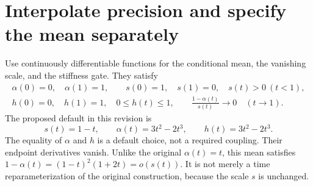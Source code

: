 \documentclass[11pt,letterpaper]{article}
\begin{document}
\section{Interpolate precision and specify the mean separately}\label{sec:path}

Use continuously differentiable functions for the conditional mean, the vanishing scale, and the stiffness gate. They satisfy
\begin{equation}\label{eq:scheduleconditions}
\begin{gathered}
\alpha(0)=0,\quad \alpha(1)=1,\qquad
s(0)=1,\quad s(1)=0,\quad s(t)>0\ (t<1),\\
h(0)=0,\quad h(1)=1,\quad 0\le h(t)\le1,
\qquad \frac{1-\alpha(t)}{s(t)}\longrightarrow0\quad(t\to1).
\end{gathered}
\end{equation}
The proposed default in this revision is
\begin{equation}\label{eq:defaults}
\boxed{\ s(t)=1-t,\qquad \alpha(t)=3t^2-2t^3,\qquad h(t)=3t^2-2t^3.\ }
\end{equation}
The equality of $\alpha$ and $h$ is a default choice, not a required coupling. Their endpoint derivatives vanish. Unlike the original $\alpha(t)=t$, this mean satisfies $1-\alpha(t)=(1-t)^2(1+2t)=o(s(t))$. It is not merely a time reparameterization of the original construction, because the scale $s$ is unchanged.
\end{document}
